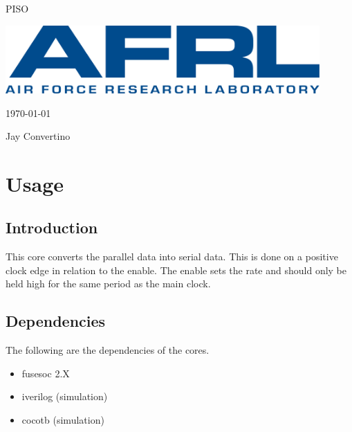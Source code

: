 \begin{titlepage}
  \begin{center}

  {\Huge PISO}

  \vspace{25mm}

  \includegraphics[width=0.90\textwidth,height=\textheight,keepaspectratio]{img/AFRL.png}

  \vspace{25mm}

  \today

  \vspace{15mm}

  {\Large Jay Convertino}

  \end{center}
\end{titlepage}

\tableofcontents

\newpage

\section{Usage}

\subsection{Introduction}

\par
This core converts the parallel data into serial data. This is done on a positive clock edge in relation to the enable.
The enable sets the rate and should only be held high for the same period as the main clock.
\subsection{Dependencies}

\par
The following are the dependencies of the cores.

\begin{itemize}
  \item fusesoc 2.X
  \item iverilog (simulation)
  \item cocotb (simulation)
\end{itemize}


